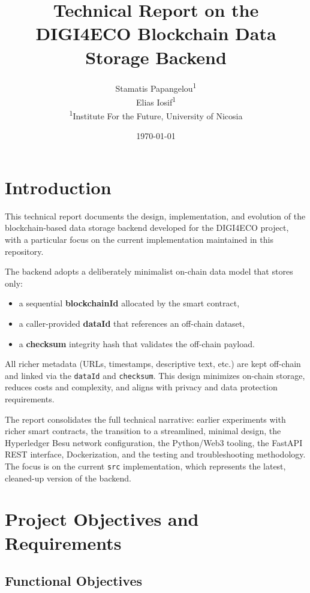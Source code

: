 \documentclass[11pt,a4paper]{article}
\title{Technical Report on the DIGI4ECO Blockchain Data Storage Backend}
\author{
  Stamatis Papangelou\textsuperscript{1} \\
  Elias Iosif\textsuperscript{1} \\[0.5em]
  \textsuperscript{1}Institute For the Future, University of Nicosia
}
\date{\today}
\begin{document}
\maketitle
\tableofcontents
\newpage

\section{Introduction}

This technical report documents the design, implementation, and evolution of the blockchain-based data storage backend developed for the DIGI4ECO project, with a particular focus on the current implementation maintained in this repository.

The backend adopts a deliberately minimalist on-chain data model that stores only:

\begin{itemize}[noitemsep]
  \item a sequential \textbf{blockchainId} allocated by the smart contract,
  \item a caller-provided \textbf{dataId} that references an off-chain dataset,
  \item a \textbf{checksum} integrity hash that validates the off-chain payload.
\end{itemize}

All richer metadata (URLs, timestamps, descriptive text, etc.) are kept off-chain and linked via the \texttt{dataId} and \texttt{checksum}. This design minimizes on-chain storage, reduces costs and complexity, and aligns with privacy and data protection requirements.

The report consolidates the full technical narrative: earlier experiments with richer smart contracts, the transition to a streamlined, minimal design, the Hyperledger Besu network configuration, the Python/Web3 tooling, the FastAPI REST interface, Dockerization, and the testing and troubleshooting methodology. The focus is on the current \texttt{src} implementation, which represents the latest, cleaned-up version of the backend.

\section{Project Objectives and Requirements}

\subsection{Functional Objectives}
\end{document}
